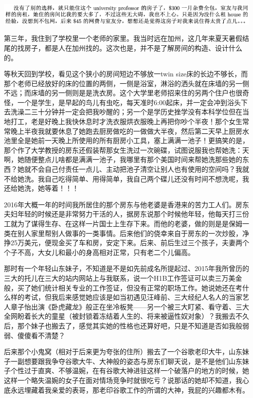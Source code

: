 \documentclass[9pt, b5paper]{article}
\begin{document}
\begin{center}
\includegraphics[width=.9\linewidth]{./pic/backups_plans_20210429_143938.png}
\end{center}

第三年，我住到了学校里一个老师的家里。我当时远在加州，这几年来夏天暑假结尾的找房子，都是人在加州找的。这次也是，并不是了解房间的构造、设计什么的。

等秋天回到学校，看见这个狭小的房间短边不够放一twin size床的长边不够长，而那个老师已经放好的床的位置的两侧，一侧是浴室，淋浴的洒头就在床墙的另一侧不远；而床墙的另一侧则是是洗衣房。这个大学里老师招来住的另两个住户也很奇怪，一个是学生，是早起的鸟儿有虫吃，每天准时6:00起床，并一定会冲到浴头下去洗澡二三十分钟并一定会把我吵醒的；另一个是学历史挫学没有本科学位但在当地打工，老是好晚上我快休息时才洗衣服烘衣服晚上再把你吵个半夜！那个女生常常晚上半夜我就要休息了她跑去厨房做吃的一做做大半夜，然后第二天早上厨房水池里全是她前一天晚上所使用的所有厨房小工具，塞上满满一池子！更搞笑的是，那个作了大学教授的房东还假装帮那女生洗过一次碗碟，试图说服我也帮她洗：天啊，她随便整点儿啥都是满满一池子，我哪里有那个美国时间来帮她洗那些她的东西？她就不会自己付责任一点儿、主动把池子清空让别人也有使用的空间吗？我就不给她洗。我自己吃得简单、用得简单，我自己两个碟儿还没有时间不想洗呢，我还给她洗，她等着！！！

2016年大概一年的时间我所居住的那个房东与他老婆是香港来的苦力工人们。房东夫妇年轻的时候还是非常努力干活的人，据房东说那个时候他年轻，他每天打三份工就为了谋得生存、在这样一片国士上生存下来。而他的老婆，做的则是是保姆一类在别人家里帮别人做事的一类事情。后来他们的侥幸来自于房东的一次炒股，净挣25万美元，便现金买了车和房，安定下来。后来、前后生过三个孩子，夫妻两个个子不高，大女儿和最小的身高相对正常，只有老二个儿偏高。

那时有一个年轻山东妹子，不知道是不是如先前成名所提起过、2015年我所曾历的三大的托儿在三大的站内网站上与我联系，说一个H1B工作签证可以卖三万美金般，买了她们统计相关专业的工作签证，但没有正常的职场工作。她说她还在考什么样的考试，但我后来感觉她应该是如当初遇见汪峰前、三大经纪人名人的当家艺人章子怡出演《卧虎藏龙》般正在坐冷板凳——另一个被三大盯紧、看守着、三大全网盼着长大的童星（被封锁着冻结着人生的、将来被逼性奴对象）？我搬去不久后，那个妹子也搬去了，感觉其实她的性格也还算好吧，只是不知道是否如我般弱弱、傻傻看不清楚？

后来那个小鬼窝（相对于后来更为夸张的住所）搬去了一个谷歌老印大牛，山东妹子一副想要跟我争夺谷歌大牛、大神般的姿态与房东们聊天说，是不是他们山东妹子个性过于直爽、不够温婉，在有谷歌大神进驻这样一个破落户的地方的时候，她这样一个略失温婉的女子在面对情场竞争时就很吃亏？说那话的她却不知道，我心底永远埋藏着我亲爱的表哥，那老印谷歌工作的所谓的大神，我屁的兴趣都木有。
\end{document}
